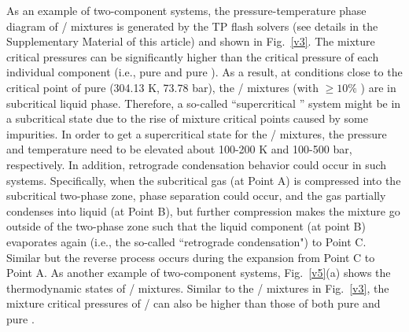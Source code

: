 As an example of two-component  systems, the pressure-temperature phase diagram of / mixtures is generated by the TP flash solvers \cite{michelsen1982isothermal} (see details in the Supplementary Material of this article) and shown in Fig.~\ref{v3}. %
The mixture critical pressures can be significantly higher than the critical pressure of each individual component (i.e., pure  and pure ).
As a result, at conditions close to the critical point of pure  (304.13 K, 73.78 bar), the / mixtures (with $\ge10\%$ ) are in subcritical liquid phase. Therefore, a so-called ``supercritical '' system might be in a subcritical state due to the rise of mixture critical points caused by some impurities. In order to get a supercritical state for the / mixtures, the pressure and temperature need to be elevated about 100-200 K and 100-500 bar, respectively. %
In addition, retrograde condensation behavior could occur in such systems. %
Specifically, when the subcritical gas (at Point A) is compressed into the subcritical two-phase zone, phase separation could occur, and the gas partially condenses into liquid (at Point B), but further compression makes the mixture go outside of the two-phase zone such that the liquid component (at point B) evaporates again (i.e., the so-called ``retrograde condensation") to Point C. Similar but the reverse process occurs during the expansion from Point C to Point A.
As another example of two-component  systems, Fig.~\ref{v5}(a) shows the thermodynamic states of / mixtures. Similar to the / mixtures in Fig.~\ref{v3}, the mixture critical pressures of / can also be higher than those of both pure  and pure .

